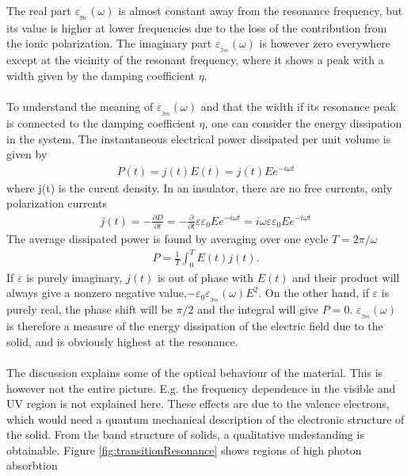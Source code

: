 %
The real part $\varepsilon\!_{_{\Re\! e}} \!\! (\omega)$ is almost constant away from the resonance
frequency, but its value is higher at lower frequencies due to the loss of the contribution from the
ionic polarization. The imaginary part $\varepsilon\!_{_{\Im\! m}} \!\! (\omega)$ is however zero 
everywhere except at the vicinity of the resonant frequency, where it shows a peak with a width
given by the damping coefficient $\eta$. 
\\
\\
To understand the meaning of $\varepsilon\!_{_{\Im\! m}} \!\! (\omega)$ and that the width
if its resonance peak is connected to the damping coefficient $\eta$, one can consider the
energy dissipation in the system. The instantaneous electrical power dissipated per unit 
volume is given by
\begin{align}
   P(t) = j(t)E(t) = j(t)Ee^{- i \omega t}
\end{align}
where j(t) is the curent density. In an insulator, there are no free currents, only polarization currents
\begin{align}
   j(t) = - \frac{\partial D}{\partial t} 
   = - \frac{\partial}{\partial t} \varepsilon \varepsilon_0 Ee^{- i \omega t}
   = i \omega \varepsilon \varepsilon_0 Ee^{- i \omega t}
\end{align}
The average dissipated power is found by averaging over one cycle $T = 2 \pi/\omega$
\begin{align}
   P = \frac{1}{T} \int_0^T E(t)j(t).
\end{align}
If $\varepsilon$ is purely imaginary, $j(t)$ is out of phase with $E(t)$ and their product will always
give a nonzero negative value,$-\varepsilon_0 \varepsilon\!_{_{\Im\! m}} \!\! (\omega) E^2$. On the other
hand, if $\varepsilon$ is purely real, the phase shift will be $\pi/2$ and the integral will give $P = 0$.
$\varepsilon\!_{_{\Im\! m}} \!\! (\omega)$ is therefore a measure of the energy dissipation of the
electric field due to the solid, and is obviously highest at the resonance.
\\
\\
The discussion explains some of the optical behaviour of the material. This is however not the
entire picture. E.g. the frequency dependence in the visible and UV region is not explained here.
These effects are due to the valence electrons, which would need a quantum mechanical description
of the electronic structure of the solid. From the band structure of solids, a qualitative
undestanding is obtainable. Figure \ref{fig:transitionResonance} shows regions of high photon absorbtion
